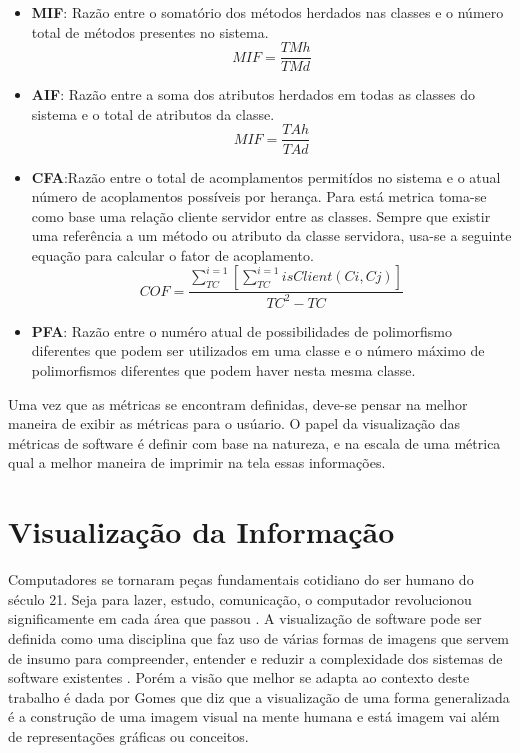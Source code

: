 \begin{itemize}
\item \textbf{MIF}: Razão entre o somatório dos métodos herdados nas classes e o número total de métodos presentes no sistema.
\begin{equation}
MIF = \frac{TMh}{TMd}
\end{equation}
\item \textbf{AIF}: Razão entre a soma dos atributos herdados em todas as classes do sistema e o total de atributos da classe.
\begin{equation}
MIF = \frac{TAh}{TAd}
\end{equation}
\item \textbf{CFA}:Razão entre o total de acomplamentos permitídos no sistema e o atual número de acoplamentos possíveis por herança. Para está metrica toma-se como base uma relação cliente servidor entre as classes. Sempre que existir uma referência a um método ou atributo da classe servidora, usa-se a seguinte equação para calcular o fator de acoplamento.
\begin{equation}
COF = \frac{\sum_{TC}^{i=1}[\sum_{TC}^{i=1}isClient(Ci,Cj)]}{TC^2-TC}
\end{equation}
\item \textbf{PFA}: Razão entre o numéro atual de possibilidades de polimorfismo diferentes que podem ser utilizados em uma classe e o número máximo de polimorfismos diferentes que podem haver nesta mesma classe.
\end{itemize}

Uma vez que as métricas se encontram definidas, deve-se pensar na melhor maneira de exibir as métricas para o usúario. O papel da visualização das métricas de software é definir com base na natureza, e na escala de uma métrica qual a melhor maneira de imprimir na tela essas informações.

\section{Visualização da Informação}
Computadores se tornaram peças fundamentais cotidiano do ser humano do século 21. Seja para lazer, estudo, comunicação, o computador revolucionou significamente em cada área que passou \cite{hasan_humancomputer_2014}.
A visualização de software pode ser definida como uma disciplina que faz uso de várias formas de imagens que servem de insumo para compreender, entender e reduzir a complexidade dos sistemas de software existentes \cite{gracanin_software_2005}. Porém a visão que melhor se adapta ao contexto deste trabalho é dada por Gomes \cite{gomes_percepcao_2011} que diz que a visualização de uma forma generalizada é a construção de uma imagem visual na mente humana e está imagem vai além de representações gráficas ou conceitos.



